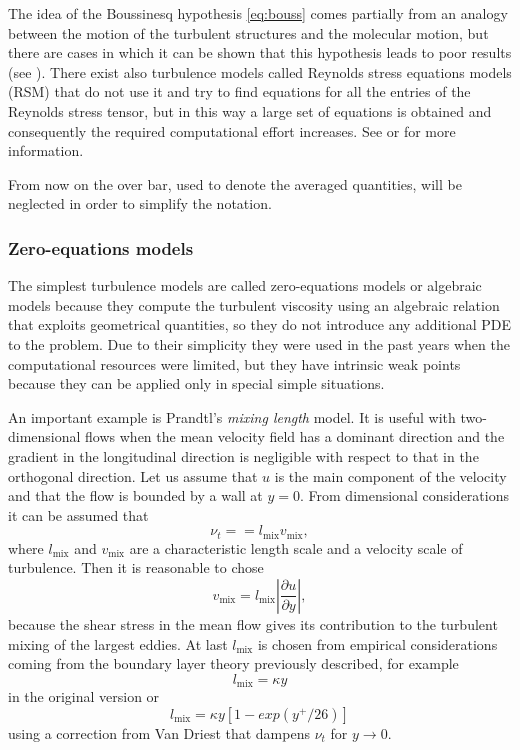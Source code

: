 The idea of the Boussinesq hypothesis \eqref{eq:bouss} comes partially from an 
analogy 
between the motion 
of the turbulent structures and the molecular motion, but there are cases in 
which it can be shown that this hypothesis leads to poor results (see 
\cite{main:pope}). There exist also turbulence models called Reynolds stress 
equations models (RSM) that do not use it and try to find equations for 
all the entries of the Reynolds stress tensor, but in this way a large set of 
equations is obtained and consequently the required computational effort 
increases. See \cite{main:pope} or \cite{main:vermal} for more information.

From now on the over bar, used to denote the averaged quantities, will be 
neglected in order to simplify the notation.

\subsubsection{Zero-equations models}
The simplest turbulence models are called zero-equations models or algebraic 
models because they compute the turbulent viscosity using an algebraic relation 
that exploits geometrical quantities, so they do not introduce any additional 
PDE to the problem. Due to their simplicity they were used in the past years 
when the computational resources were limited, but they have intrinsic weak 
points because they can be applied only in special simple situations.

An important example is Prandtl's \emph{mixing length} model. It is 
useful with two-dimensional flows when the mean velocity field has a dominant 
direction and the gradient in the longitudinal direction is negligible with 
respect to that in the orthogonal direction. Let us assume that $u$ is the 
main component of the velocity and that the flow is bounded by a wall at $y=0$. 
From dimensional considerations it can be assumed that
\begin{equation}
\nu_t = = l_\text{mix}v_\text{mix},
\end{equation}
where $l_\text{mix}$ and $v_\text{mix}$ are a characteristic length scale and a 
velocity 
scale of turbulence. Then it is reasonable to chose
\begin{equation}
	v_\text{mix} = l_\text{mix} \left\lvert \frac{\partial u}{\partial y} 
	\right\rvert,
\end{equation}
because the shear stress in the mean flow gives its contribution to the 
turbulent mixing of the largest eddies. At last $l_\text{mix}$ is chosen from 
empirical considerations coming from the boundary layer theory previously 
described, for example
\begin{equation}
l_\text{mix} = \kappa y
\end{equation}
in the original version or
\begin{equation}
l_\text{mix} = \kappa y[1 - exp(y^+ / 26)]
\end{equation}
using a correction from Van Driest that dampens $\nu_t$ for $y \rightarrow 0$.
%
